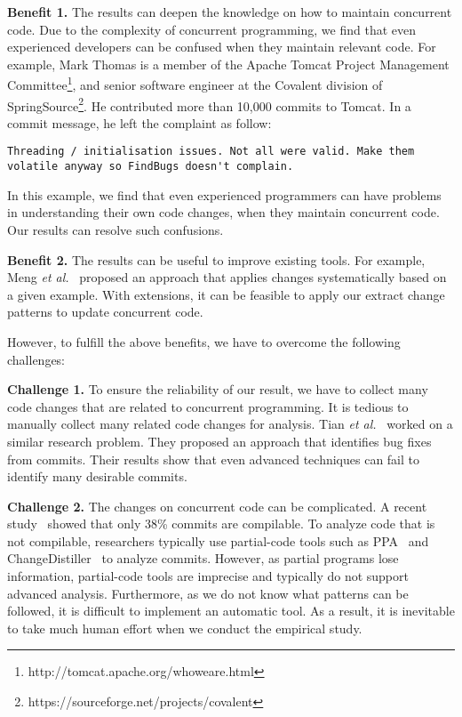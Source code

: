 \noindent
\textbf{Benefit 1.} The results can deepen the knowledge on how to maintain concurrent code. Due to the complexity of concurrent programming, we find that even experienced developers can be confused when they maintain relevant code. For example, Mark Thomas is a member of the Apache Tomcat Project Management Committee\footnote{http://tomcat.apache.org/whoweare.html}, and senior software engineer at the Covalent division of SpringSource\footnote{https://sourceforge.net/projects/covalent}. He contributed more than 10,000 commits to Tomcat. In a commit message, he left the complaint as follow:


\begin{lstlisting}
Threading / initialisation issues. Not all were valid. Make them volatile anyway so FindBugs doesn't complain.
\end{lstlisting}

\noindent
In this example, we find that even experienced programmers can have problems in understanding their own code changes, when they maintain concurrent code. Our results can resolve such confusions.


\noindent
\textbf{Benefit 2.} The results can be useful to improve existing tools. For example, Meng \emph{et al.}~\cite{conf/pldi/MengKM11} proposed an approach that applies changes systematically based on a given example. With extensions, it can be feasible to apply our extract change patterns to update concurrent code.


However, to fulfill the above benefits, we have to overcome the following challenges:

\noindent
\textbf{Challenge 1.} To ensure the reliability of our result, we have to collect many code changes that are related to concurrent programming. It is tedious to manually collect many related code changes for analysis. Tian \emph{et al.}~\cite{tian2012identifying} worked on a similar research problem. They proposed an approach that identifies bug fixes from commits. Their results show that even advanced techniques can fail to identify many desirable commits.


\noindent
\textbf{Challenge 2.} The changes on concurrent code can be complicated. A recent study~\cite{tufano2016there} showed that only 38\% commits are compilable. To analyze code that is not compilable, researchers typically use partial-code tools such as PPA~\cite{DagenaisH08ppa} and ChangeDistiller~\cite{fluri2007change} to analyze commits. However, as partial programs lose information, partial-code tools are imprecise and typically do not support advanced analysis. Furthermore, as we do not know what patterns can be followed, it is difficult to implement an automatic tool. As a result, it is inevitable to take much human effort when we conduct the empirical study.


